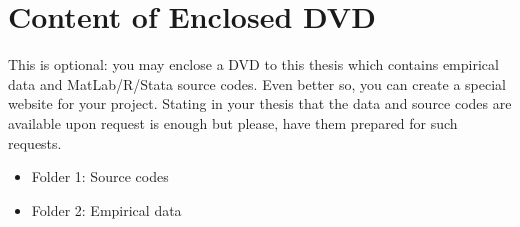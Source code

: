 \chapter{Content of Enclosed DVD}

This is optional: you may enclose a DVD to this thesis which contains empirical data and MatLab/R/Stata source codes. Even better so, you can create a special website for your project. Stating in your thesis that the data and source codes are available upon request is enough but please, have them prepared for such requests.

\begin{itemize}
    \item Folder 1: Source codes
    \item Folder 2: Empirical data
\end{itemize}
